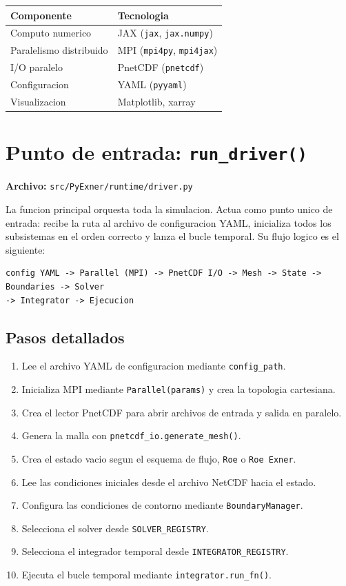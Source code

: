 \documentclass[11pt,a4paper]{article}
\newcommand{\code}[1]{\texttt{#1}}
\begin{document}
\begin{tabularx}{\textwidth}{L{4.2cm}Y}
\toprule
Componente & Tecnologia \\
\midrule
Computo numerico & JAX (\code{jax}, \code{jax.numpy}) \\
Paralelismo distribuido & MPI (\code{mpi4py}, \code{mpi4jax}) \\
I/O paralelo & PnetCDF (\code{pnetcdf}) \\
Configuracion & YAML (\code{pyyaml}) \\
Visualizacion & Matplotlib, xarray \\
\bottomrule
\end{tabularx}

\section{Punto de entrada: \code{run\_driver()}}

\textbf{Archivo:} \code{src/PyExner/runtime/driver.py}

La funcion principal orquesta toda la simulacion. Actua como punto unico de entrada: recibe la ruta
al archivo de configuracion YAML, inicializa todos los subsistemas en el orden correcto y lanza el
bucle temporal. Su flujo logico es el siguiente:

\begin{Verbatim}[fontsize=\small]
config YAML -> Parallel (MPI) -> PnetCDF I/O -> Mesh -> State -> Boundaries -> Solver 
-> Integrator -> Ejecucion
\end{Verbatim}

\subsection{Pasos detallados}

\begin{enumerate}[leftmargin=1.8em]
  \item Lee el archivo YAML de configuracion mediante \code{config\_path}.
  \item Inicializa MPI mediante \code{Parallel(params)} y crea la topologia cartesiana.
  \item Crea el lector PnetCDF para abrir archivos de entrada y salida en paralelo.
  \item Genera la malla con \code{pnetcdf\_io.generate\_mesh()}.
  \item Crea el estado vacio segun el esquema de flujo, \code{Roe} o \code{Roe Exner}.
  \item Lee las condiciones iniciales desde el archivo NetCDF hacia el estado.
  \item Configura las condiciones de contorno mediante \code{BoundaryManager}.
  \item Selecciona el solver desde \code{SOLVER\_REGISTRY}.
  \item Selecciona el integrador temporal desde \code{INTEGRATOR\_REGISTRY}.
  \item Ejecuta el bucle temporal mediante \code{integrator.run\_fn()}.
\end{enumerate}
\end{document}
